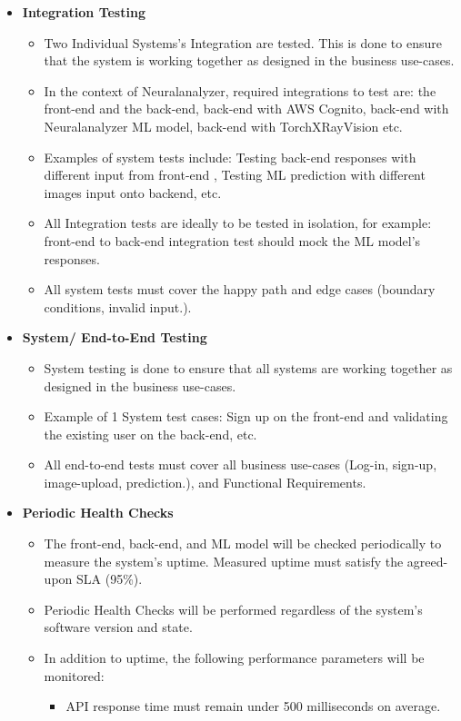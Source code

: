 \documentclass[12pt, titlepage]{article}
\begin{document}
\begin{itemize}
  \item[]{\textbf{Integration Testing}}
  \begin{itemize}
    \item{Two Individual Systems's Integration are tested. This is done to ensure that the system is working together as designed in the business use-cases.}
    \item{In the context of Neuralanalyzer, required integrations to test are: the front-end and the back-end, back-end with AWS Cognito, back-end with Neuralanalyzer ML model, back-end with TorchXRayVision etc.}
    \item{Examples of system tests include: Testing back-end responses with different input from front-end , Testing ML prediction with different images input onto backend, etc.}
    \item{All Integration tests are ideally to be tested in isolation, for example: front-end to back-end integration test should mock the ML model's responses.}
    \item{All system tests must cover the happy path and edge cases (boundary conditions, invalid input.).}
  \end{itemize}
  \item[]{\textbf{System/ End-to-End Testing}}
  \begin{itemize}
    \item{System testing is done to ensure that all systems are working together as designed in the business use-cases.}
    \item{Example of 1 System test cases: Sign up on the front-end and validating the existing user on the back-end, etc.}
    \item{All end-to-end tests must cover all business use-cases (Log-in, sign-up, image-upload, prediction.), and Functional Requirements.}
  \end{itemize}
\item[]{\textbf{Periodic Health Checks}}
\begin{itemize}
  \item{The front-end, back-end, and ML model will be checked periodically to measure the system's uptime. Measured uptime must satisfy the agreed-upon SLA (95\%).}
  \item{Periodic Health Checks will be performed regardless of the system's software version and state.}
  \item{In addition to uptime, the following performance parameters will be monitored:}
  \begin{itemize}
    \item{API response time must remain under 500 milliseconds on average.}

\end{itemize}
\end{itemize}
\end{itemize}
\end{document}
